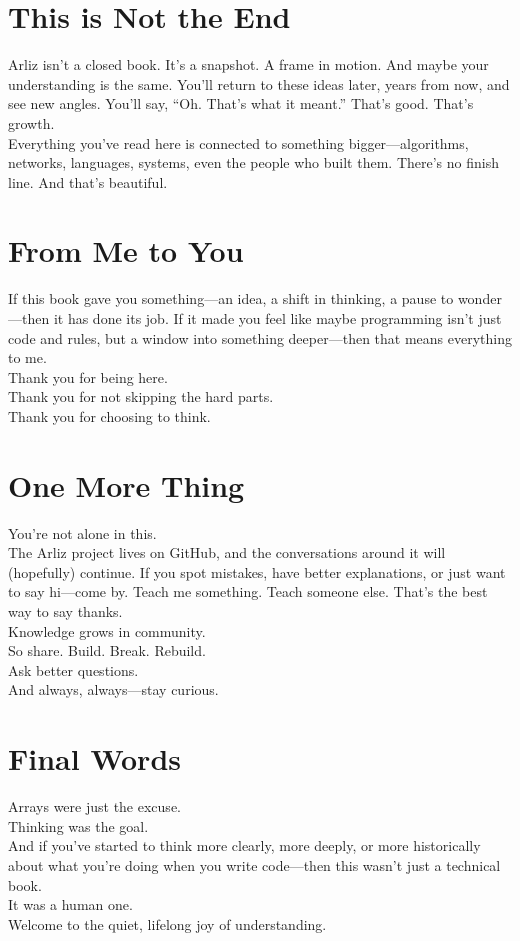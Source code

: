 	\section*{This is Not the End}
	Arliz isn’t a closed book. It’s a snapshot. A frame in motion. And maybe your understanding is the same. You'll return to these ideas later, years from now, and see new angles. You’ll say, “Oh. That’s what it meant.” That’s good. That’s growth.\\	
	Everything you’ve read here is connected to something bigger—algorithms, networks, languages, systems, even the people who built them. There’s no finish line. And that’s beautiful.  
	\section*{From Me to You}
	If this book gave you something—an idea, a shift in thinking, a pause to wonder—then it has done its job. If it made you feel like maybe programming isn’t just code and rules, but a window into something deeper—then that means everything to me.\\	
	Thank you for being here.\\
	Thank you for not skipping the hard parts.\\
	Thank you for choosing to think.
	\section*{One More Thing}
	You’re not alone in this.\\
	The Arliz project lives on GitHub, and the conversations around it will (hopefully) continue. If you spot mistakes, have better explanations, or just want to say hi—come by. Teach me something. Teach someone else. That’s the best way to say thanks.\\
	Knowledge grows in community.\\
	So share. Build. Break. Rebuild.\\
	Ask better questions.\\
	And always, always—stay curious.\\
	\section*{Final Words}
	Arrays were just the excuse.\\
	Thinking was the goal.\\
	And if you’ve started to think more clearly, more deeply, or more historically about what you’re doing when you write code—then this wasn’t just a technical book.\\
	It was a human one.\\
	Welcome to the quiet, lifelong joy of understanding.\\
	

